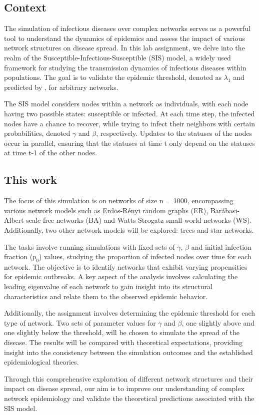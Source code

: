 \subsection{Context}
The simulation of infectious diseases over complex networks serves as a powerful tool to understand the dynamics of epidemics and assess the impact of various network structures on disease spread. In this lab assignment, we delve into the realm of the Susceptible-Infectious-Susceptible (SIS) model, a widely used framework for studying the transmission dynamics of infectious diseases within populations. The goal is to validate the epidemic threshold, denoted as $\lambda_{1}$ and predicted by \cite{Chakrabarti2008}, for arbitrary networks.

The SIS model considers nodes within a network as individuals, with each node having two possible states: susceptible or infected. At each time step, the infected nodes have a chance to recover, while trying to infect their neighbors with certain probabilities, denoted $\gamma$ and $\beta$, respectively. Updates to the statuses of the nodes occur in parallel, ensuring that the statuses at time t only depend on the statuses at time t-1 of the other nodes.

\subsection{This work}
The focus of this simulation is on networks of size n = 1000, encompassing various network models such as Erdös-Rényi random graphs (ER), Barábasi-Albert scale-free networks (BA) and Watts-Strogatz small world networks (WS). Additionally, two other network models will be explored: trees and star networks.

The tasks involve running simulations with fixed sets of $\gamma$, $\beta$ and initial infection fraction ($p_{0}$) values, studying the proportion of infected nodes over time for each network. The objective is to identify networks that exhibit varying propensities for epidemic outbreaks. A key aspect of the analysis involves calculating the leading eigenvalue of each network to gain insight into its structural characteristics and relate them to the observed epidemic behavior.

Additionally, the assignment involves determining the epidemic threshold for each type of network. Two sets of parameter values for $\gamma$ and $\beta$, one slightly above and one slightly below the threshold, will be chosen to simulate the spread of the disease. The results will be compared with theoretical expectations, providing insight into the consistency between the simulation outcomes and the established epidemiological theories.

Through this comprehensive exploration of different network structures and their impact on disease spread, our aim is to improve our understanding of complex network epidemiology and validate the theoretical predictions associated with the SIS model.
